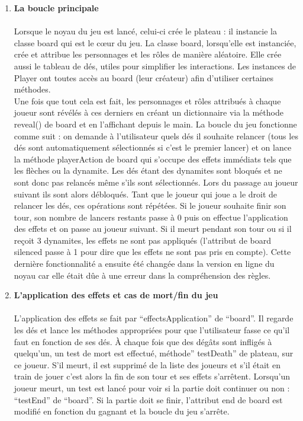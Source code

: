 \documentclass[a4paper,11pt]{article}
\begin{document}
\begin{enumerate}
	\item \textbf{La boucle principale} \\\\
	Lorsque le noyau du jeu est lancé, celui-ci crée le plateau : il instancie la classe board qui est le cœur du jeu. La classe board, lorsqu’elle est instanciée, crée et attribue les personnages et les rôles de manière aléatoire. Elle crée aussi le tableau de dés, utiles pour simplifier les interactions. Les instances de Player ont toutes accès au board (leur créateur) afin d’utiliser certaines méthodes.  \\
Une fois que tout cela est fait, les personnages et rôles attribués à chaque joueur sont révélés à ces derniers en créant un dictionnaire via la méthode reveal() de board et en l’affichant depuis le main. La boucle du jeu fonctionne comme suit : on demande à l’utilisateur quels dés il souhaite relancer (tous les dés sont automatiquement sélectionnés si c’est le premier lancer) et on lance la méthode playerAction de board qui s’occupe des effets immédiats tels que les flèches ou la dynamite. Les dés étant des dynamites sont bloqués et ne sont donc pas relancés même s’ils sont sélectionnés. Lors du passage au joueur suivant ils sont alors débloqués. Tant que le joueur qui joue a le droit de relancer les dés, ces opérations sont répétées. Si le joueur souhaite finir son tour, son nombre de lancers restants passe à 0 puis on effectue l’application des effets et on passe au joueur suivant. Si il meurt pendant son tour ou si il reçoit 3 dynamites, les effets ne sont pas appliqués (l’attribut de board silenced passe à 1 pour dire que les effets ne sont pas pris en compte). Cette dernière fonctionnalité a ensuite été changée dans la version en ligne du noyau car elle était dûe à une erreur dans la compréhension des règles. \\

\newpage

	\item \textbf{L’application des effets et cas de mort/fin du jeu} \\\\
	L’application des effets se fait par “effectsApplication” de “board”. Il regarde les dés et lance les méthodes appropriées pour que l’utilisateur fasse ce qu’il faut en fonction de ses dés. À chaque fois que des dégâts sont infligés à quelqu’un, un test de mort est effectué, méthode” testDeath” de plateau, sur ce joueur. S’il meurt, il est supprimé de la liste des joueurs et s’il était en train de jouer c’est alors la fin de son tour et ses effets s’arrêtent. Lorsqu’un joueur meurt, un test est lancé pour voir si la partie doit continuer ou non : “testEnd” de “board”. Si la partie doit se finir, l’attribut end de board est modifié en fonction du gagnant et la boucle du jeu s’arrête. \\




\end{enumerate}
\end{document}
